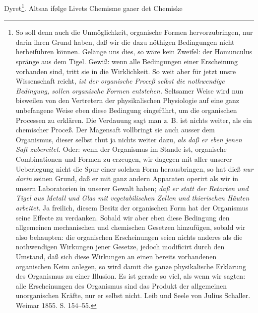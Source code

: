 \documentclass[12pt,a4paper]{book}
\begin{document}
Dyret\footnote{So soll denn auch die Unmöglichkeit, organische
Formen hervorzubringen, nur darin ihren Grund haben, daß wir die
dazu nöthigen Bedingungen nicht herbeiführen können. Gelänge uns
dies, so wäre kein Zweifel: der Homunculus spränge aus dem Tigel.
Gewiß: wenn alle Bedingungen einer Erscheinung vorhanden sind,
tritt sie in die Wirklichkeit. So weit aber für jetzt unsre
Wissenschaft reicht, \emph{ist der organische Proceß selbst die
nothwendige Bedingung, sollen organische Formen entstehen.}
Seltsamer Weise wird nun bisweilen von den Vertretern der
physikalischen Physiologie auf eine ganz unbefangene Weise eben
diese Bedingung eingeführt, um die organischen Processen zu
erklären. Die Verdauung sagt man z. B. ist nichts weiter, als ein
chemischer Proceß. Der Magensaft vollbringt sie auch ausser dem
Organismus, dieser selbst thut ja nichts weiter dazu, \emph{als daß er
eben jenen Saft zubereitet.} Oder: wenn der Organismus im Stande
ist, organische Combinationen und Formen zu erzeugen, wir dagegen
mit aller unserer Ueberlegung nicht die Spur einer solchen Form
herausbringen, so hat dieß \emph{nur darin} seinen Grund, daß er mit ganz
andern Apparaten operirt als wir in unsern Laboratorien
in unserer Gewalt haben; \emph{daß er statt der Retorten und Tigel aus Metall
und Glas mit vegetabilischen Zellen und thierischen Häuten arbeitet.} Ja
freilich, diesem Besitz der organischen Form hat der Organismus seine
Effecte zu verdanken. Sobald wir aber eben diese Bedingung den
allgemeinen mechanischen und chemischen Gesetzen hinzufügen, sobald wir
also behaupten: die organischen Erscheinungen seien nichts anderes als
die nothwendigen Wirkungen jener Gesetze, jedoch modificirt durch den
Umstand, daß sich diese Wirkungen an einen bereits vorhandenen
organischen Keim anlegen, so wird damit die ganze physikalische
Erklärung des Organismus zu einer Illusion. Es ist gerade so viel, als
wenn wir sagten: alle Erscheinungen des Organismus sind das Produkt der
allgemeinen unorganischen Kräfte, nur er selbst nicht. Leib und Seele
von Julius Schaller. Weimar 1855. S. 154--55.}. Altsaa ifølge Livets Chemisme gaaer det Chemiske
\end{document}
